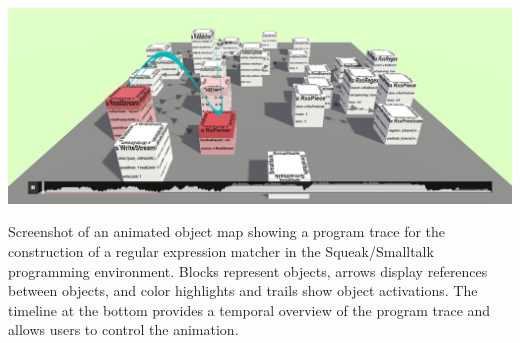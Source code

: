 \documentclass[sigconf,natbib=false,nonacm,screen]{acmart}
\begin{document}

\begin{teaserfigure}
	\includegraphics[width=\textwidth]{trace4d}
	\caption{
		Screenshot of an animated object map showing a program trace for the construction of a regular expression matcher in the Squeak/Smalltalk programming environment.
		Blocks represent objects, arrows display references between objects, and color highlights and trails show object activations.
		The timeline at the bottom provides a temporal overview of the program trace and allows users to control the animation.
	}
	\label{fig:teaser}
\end{teaserfigure}

\maketitle












\printbibliography
\balance

\appendix

\end{document}
